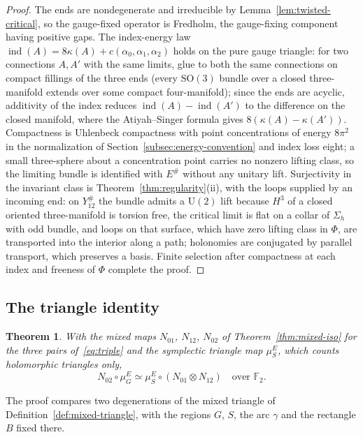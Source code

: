 \documentclass[11pt]{amsart}
\newtheorem{theorem}{Theorem}[section]
\theoremstyle{definition}
\theoremstyle{remark}
\theoremstyle{plain}
\numberwithin{equation}{section}
\newcommand{\FF}{\mathbb{F}_2}
\newcommand{\ind}{\operatorname{ind}}
\newcommand{\SO}{\mathrm{SO}}
\newcommand{\U}{\mathrm{U}}
\begin{document}
\begin{proof}
The ends are nondegenerate and irreducible by
Lemma~\ref{lem:twisted-critical}, so the gauge-fixed operator is Fredholm, the gauge-fixing component having positive gaps. The index-energy law
$\ind(A)=8\kappa(A)+c(\alpha_0,\alpha_1,\alpha_2)$ holds on the pure gauge triangle:
for two connections $A,A'$ with the same limits, glue to both the same
connections on compact fillings of the three ends (every $\SO(3)$ bundle over
a closed three-manifold extends over some compact four-manifold); since the
ends are acyclic, additivity of the index \cite[Proposition~3.9]{Donaldson-book}
reduces $\ind(A)-\ind(A')$ to the difference on the closed manifold, where the
Atiyah--Singer formula gives $8(\kappa(A)-\kappa(A'))$. Compactness is
Uhlenbeck compactness with point concentrations of energy $8\pi^2$ in the
normalization of Section~\ref{subsec:energy-convention} and index loss
eight; a small three-sphere about a concentration point carries no
nonzero lifting class, so the limiting bundle is identified with $E^\#$ without any
unitary lift. Surjectivity in the invariant class is
Theorem~\ref{thm:regularity}(ii), with the loops supplied by an incoming
end: on $Y_{12}^\#$ the bundle admits a $\U(2)$ lift because $H^3$ of a
closed oriented three-manifold is torsion free, the critical limit is
flat on a collar of $\Sigma_h$ with odd bundle, and loops on that surface,
which have zero lifting class in $\Phi$, are transported into the interior along a
path; holonomies are conjugated by parallel transport, which preserves a
basis. Finite selection after compactness at each index and freeness of
$\Phi$ complete the proof.
\end{proof}

\subsection{The triangle identity}

\begin{theorem}\label{thm:triangle}
With the mixed maps $N_{01}$, $N_{12}$, $N_{02}$ of
Theorem~\ref{thm:mixed-iso} for the three pairs of~\eqref{eq:triple} and
the symplectic triangle map $\mu_S^E$, which counts holomorphic triangles only,
\[
N_{02}\circ\mu_G^E\simeq\mu_S^E\circ(N_{01}\otimes N_{12})
\quad\text{over }\FF .
\]
\end{theorem}

The proof compares two degenerations of the mixed triangle of
Definition~\ref{def:mixed-triangle}, with the regions $G$, $S$, the arc $\gamma$ and the
rectangle $B$ fixed there.
\end{document}
